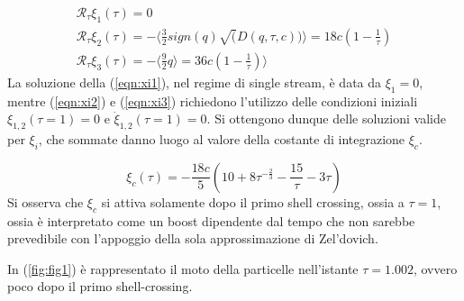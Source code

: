 \begin{gather}
    \label{eqn:xi1}
    \mathcal{R}_{\tau} \xi_1(\tau) = 0 \\
    \label{eqn:xi2}
    \mathcal{R}_{\tau} \xi_2(\tau) = - \Big\langle \frac{3}{2} sign(q) \sqrt(D(q, \tau, c)) \Big\rangle = 18c (1-\frac{1}{\tau}) \\
    \label{eqn:xi3}
    \mathcal{R}_{\tau} \xi_3(\tau) = - \Big \langle \frac{9}{2} q \Big \rangle = 36c (1-\frac{1}{\tau})\Big\rangle 
\end{gather}
La soluzione della (\ref{eqn:xi1}), nel regime di single stream, è data da $\xi_1=0$, mentre (\ref{eqn:xi2}) 
e (\ref{eqn:xi3}) richiedono l'utilizzo delle condizioni iniziali $\xi_{1,2}(\tau=1)=0$ e $\dot{\xi}_{1,2}(\tau=1)=0$.
Si ottengono dunque delle soluzioni valide per $\xi_i$, che sommate danno luogo al valore della costante
di integrazione $\xi_c$.

\begin{equation}
    \label{eqn:xic}
    \xi_c(\tau)= -\frac{18c}{5}\left(10+8\tau^{-\frac{2}{3}}-\frac{15}{\tau}-3\tau\right)
\end{equation}
Si osserva che $\xi_c$ si attiva solamente dopo il primo shell crossing, ossia a $\tau=1$,
ossia è interpretato come un boost dipendente dal tempo che non sarebbe prevedibile con l'appoggio
della sola approssimazione di Zel'dovich.

In (\ref{fig:fig1}) è rappresentato il moto della particelle nell'istante $\tau=1.002$, ovvero
poco dopo il primo shell-crossing.

